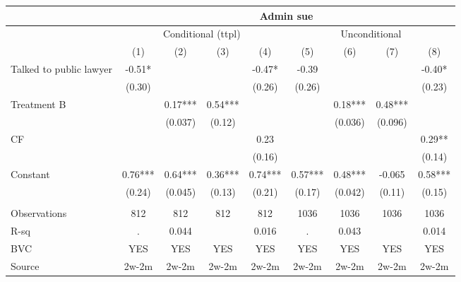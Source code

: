 \begin{tabular}{lcccccccc}
\toprule
      & \multicolumn{8}{c}{Admin sue} \\
\midrule
\midrule
      & \multicolumn{4}{c}{Conditional (ttpl)} & \multicolumn{4}{c}{Unconditional} \\
\midrule
      & (1)   & (2)   & (3)   & (4)   & (5)   & (6)   & (7)   & (8) \\
\midrule
\midrule
Talked to public lawyer & -0.51* &       &       & -0.47* & -0.39 &       &       & -0.40* \\
      & (0.30) &       &       & (0.26) & (0.26) &       &       & (0.23) \\
Treatment B &       & 0.17*** & 0.54*** &       &       & 0.18*** & 0.48*** &  \\
      &       & (0.037) & (0.12) &       &       & (0.036) & (0.096) &  \\
CF    &       &       &       & 0.23  &       &       &       & 0.29** \\
      &       &       &       & (0.16) &       &       &       & (0.14) \\
Constant & 0.76*** & 0.64*** & 0.36*** & 0.74*** & 0.57*** & 0.48*** & -0.065 & 0.58*** \\
      & (0.24) & (0.045) & (0.13) & (0.21) & (0.17) & (0.042) & (0.11) & (0.15) \\
      &       &       &       &       &       &       &       &  \\
\midrule
Observations & 812   & 812   & 812   & 812   & 1036  & 1036  & 1036  & 1036 \\
R-sq  & .     & 0.044 &       & 0.016 & .     & 0.043 &       & 0.014 \\
BVC   & YES   & YES   & YES   & YES   & YES   & YES   & YES   & YES \\
Source & 2w-2m & 2w-2m & 2w-2m & 2w-2m & 2w-2m & 2w-2m & 2w-2m & 2w-2m \\
\bottomrule
\bottomrule
\end{tabular}%
